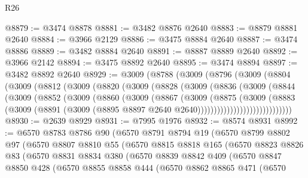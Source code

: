 \begin{lexlean}{R26}
\begin{coremodule}
@8879 := @3474 @8878
@8881 := @3482 @8876 @2640
@8883 := @8879 @8881 @2640
@8884 := @3966 @2129
@8886 := @3475 @8884 @2640
@8887 := @3474 @8886
@8889 := @3482 @8884 @2640
@8891 := @8887 @8889 @2640
@8892 := @3966 @2142
@8894 := @3475 @8892 @2640
@8895 := @3474 @8894
@8897 := @3482 @8892 @2640
@8929 := @3009
    (@8788
      (@3009
        (@8796
          (@3009
            (@8804
              (@3009
                (@8812
                  (@3009
                    (@8820
                      (@3009
                        (@8828
                          (@3009
                            (@8836
                              (@3009
                                (@8844
                                  (@3009
                                    (@8852
                                      (@3009
                                        (@8860
                                          (@3009
                                            (@8867
                                              (@3009
                                                (@8875
                                                  (@3009
                                                    (@8883
                                                      (@3009
                                                        (@8891
                                                          (@3009
                                                            (@8895
                                                              @8897
                                                              @2640
                                                              @2640)))))))))))))))))))))))))))))
@8930 := @2639 @8929
@8931 := @7995 @1976
@8932 := @8574 @8931
@8992 := @6570
    @8783
    @8786
    @90
    (@6570
      @8791
      @8794
      @19
      (@6570
        @8799
        @8802
        @97
        (@6570
          @8807
          @8810
          @55
          (@6570
            @8815
            @8818
            @165
            (@6570
              @8823
              @8826
              @83
              (@6570
                @8831
                @8834
                @380
                (@6570
                  @8839
                  @8842
                  @409
                  (@6570
                    @8847
                    @8850
                    @428
                    (@6570
                      @8855
                      @8858
                      @444
                      (@6570
                        @8862
                        @8865
                        @471
                        (@6570

\end{coremodule}
\end{lexlean}
